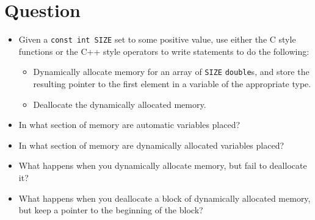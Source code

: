 \newpage


\section{Question}

\begin{itemize}

  \item Given a \texttt{const int SIZE} set to some positive value,
    use either the C style functions or the C++ style operators to write
    statements to do the following:
    \begin{itemize}
      \item Dynamically allocate memory for an array of \texttt{SIZE}
        \texttt{double}s, and store the resulting pointer to the first
        element in a variable of the appropriate type.
      \item Deallocate the dynamically allocated memory.
    \end{itemize}
    \vfill

  \item In what section of memory are automatic variables placed?
    \vfill

  \item In what section of memory are dynamically allocated variables placed?
    \vfill

  \item What happens when you dynamically allocate memory, but fail to
    deallocate it?
    \vfill

  \item What happens when you deallocate a block of dynamically allocated
    memory, but keep a pointer to the beginning of the block?
    \vfill

\end{itemize}

\newpage

